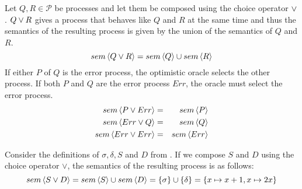 \begin{definition}
\label{def:sem_choice}
Let $Q, R \in \mathcal{P}$ be processes and let them be composed using the choice operator $\vee$. $Q \vee R$ gives a process that behaves like $Q$ and $R$ at the same time and thus the semantics of the resulting process is given by the union of the semantics of $Q$ and $R$.
  \begin{equation}
    \label{eqn:sem_choice}
    sem \left\langle Q \vee R \right\rangle = sem \left\langle Q \right\rangle \cup sem \left\langle R \right\rangle
  \end{equation}
If either $P$ of $Q$ is the error process, the optimistic oracle selects the other process. If both $P$ and $Q$ are the error process $Err$, the oracle must select the error process.
  \begin{eqnarray}
    sem \left\langle P \vee Err \right\rangle & = & sem \left\langle P \right\rangle \\
    sem \left\langle Err \vee Q \right\rangle & = & sem \left\langle Q \right\rangle \\
    sem \left\langle Err \vee Err \right\rangle & = & sem \left\langle Err \right\rangle
  \end{eqnarray}
  \hfill\qedsymbol
\end{definition}

\begin{example}
\label{exp:sem_chice}
Consider the definitions of $\sigma, \delta, S$ and $D$ from . If we compose $S$ and $D$ using the choice operator $\vee$, the semantics of the resulting process is as follows:
  \begin{equation}
    sem \left\langle S \vee D \right\rangle = sem \left\langle S \right\rangle \cup sem \left\langle D \right\rangle = \left\{ \sigma \right\} \cup \left\{ \delta \right\} = \left\{ x \mapsto x+1, x \mapsto 2x \right\}
  \end{equation}
  \hfill\qedsymbol
\end{example}


